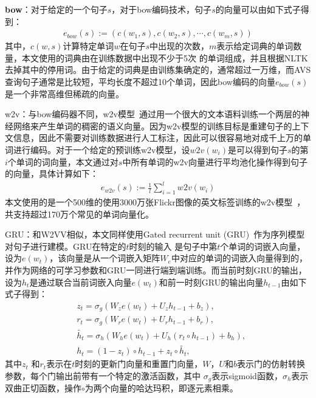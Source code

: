 \textbf{bow}：对于给定的一个句子$s$，对于bow编码技术，句子$s$的向量可以由如下式子得到：
\begin{equation}
    \label{eq:bow}
    \begin{aligned}
        e_{bow}(s) := (c(w_1,s),c(w_2,s),\cdots,c(w_m,s))
    \end{aligned}
\end{equation}
其中，$c(w,s)$计算特定单词$w$在句子$s$中出现的次数，$m$表示给定词典的单词数量，本文使用的词典由在训练数据中出现不少于5次
的单词组成，并且根据NLTK去掉其中的停用词。由于给定的词典是由训练集确定的，通常超过一万维，而AVS查询句子通常是比较短，平均长度不超过10个单词，因此bow编码的向量$e_{bow}(s)$是一个非常高维但稀疏的向量。

w2v：与bow编码器不同，w2v模型~\cite{mikolov2013efficient}通过用一个很大的文本语料训练一个两层的神经网络来产生单词的稠密的语义向量。因为w2v模型的训练目标是重建句子的上下文信息，因此不需要对训练数据进行人工标注，因此可以很容易地对成千上万的单词进行编码。对于一个给定的预训练w2v模型，设$w2v(w_i)$是可以得到句子$s$的第$i$个单词的词向量，本文通过对$s$中所有单词的w2v向量进行平均池化操作得到句子的向量，具体计算如下：
\begin{equation}
    \label{eq:w2v}
    \begin{aligned}
        e_{w2v}(s) := \frac{1}{l}\sum^l_{i=1}w2v(w_i)
    \end{aligned}
\end{equation}
本文使用的是一个500维的使用3000万张Flickr图像的英文标签训练的w2v模型~\cite{dong2018predicting}，共支持超过170万个常见的单词向量化。

GRU：和W2VV相似，本文同样使用Gated recurrent unit (GRU)~\cite{cho2014learning}作为序列模型对句子进行建模。GRU在特定的$t$时刻的输入
是句子中第$t$个单词的词嵌入向量，设为$e(w_t)$，该向量是从一个词嵌入矩阵$W_e$中对应的单词的词嵌入向量得到的，并作为网络的可学习参数和GRU一同进行端到端训练。而当前时刻GRU的输出，设为$h_t$是通过联合当前词嵌入向量$e(w_t)$和前一时刻GRU的输出向量$h_{t-1}$由如下式子得到：
\begin{equation}
    \label{eq:gru}
    \begin{aligned}
        & z_t = \sigma_g(W_z e(w_t) + U_z h_{t-1} + b_z), \\
        & r_t = \sigma_g(W_r e(w_t) + U_r h_{t-1} + b_r), \\
        & \widetilde{h_t} = \sigma_h(W_h e(w_t) + U_h (r_t \circ h_{t-1}) + b_h), \\
        & h_t = (1-z_t) \circ h_{t-1} + z_t \circ \widetilde{h_t},
    \end{aligned}
\end{equation}
其中$z_t$ 和$r_t$表示在$t$时刻的更新门向量和重置门向量，$W$，$U$和$b$表示门的仿射转换参数，每个门输出前带有一个特定的激活函数，其中
$\sigma_g$表示sigmoid函数，$\sigma_h$表示双曲正切函数，操作$\circ$为两个向量的哈达玛积，即逐元素相乘。

